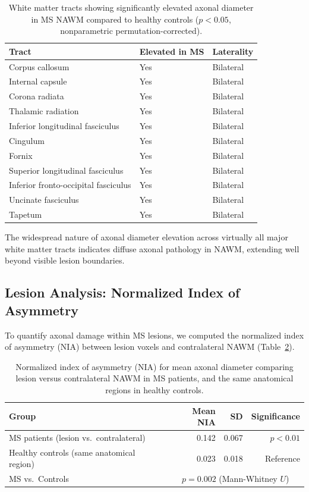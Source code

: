 \documentclass[11pt]{article}
\begin{document}
\begin{table}[H]
\centering
\caption{White matter tracts showing significantly elevated axonal diameter in MS NAWM compared to healthy controls ($p < 0.05$, nonparametric permutation-corrected).}
\label{tab:tbss}
\begin{tabular}{lll}
\toprule
\textbf{Tract} & \textbf{Elevated in MS} & \textbf{Laterality} \\
\midrule
Corpus callosum & Yes & Bilateral \\
Internal capsule & Yes & Bilateral \\
Corona radiata & Yes & Bilateral \\
Thalamic radiation & Yes & Bilateral \\
Inferior longitudinal fasciculus & Yes & Bilateral \\
Cingulum & Yes & Bilateral \\
Fornix & Yes & Bilateral \\
Superior longitudinal fasciculus & Yes & Bilateral \\
Inferior fronto-occipital fasciculus & Yes & Bilateral \\
Uncinate fasciculus & Yes & Bilateral \\
Tapetum & Yes & Bilateral \\
\bottomrule
\end{tabular}
\end{table}

The widespread nature of axonal diameter elevation across virtually all major white matter tracts indicates diffuse axonal pathology in NAWM, extending well beyond visible lesion boundaries.

\subsection{Lesion Analysis: Normalized Index of Asymmetry}

To quantify axonal damage within MS lesions, we computed the normalized index of asymmetry (NIA) between lesion voxels and contralateral NAWM (Table~\ref{tab:nia}).

\begin{table}[H]
\centering
\caption{Normalized index of asymmetry (NIA) for mean axonal diameter comparing lesion versus contralateral NAWM in MS patients, and the same anatomical regions in healthy controls.}
\label{tab:nia}
\begin{tabular}{lrrr}
\toprule
\textbf{Group} & \textbf{Mean NIA} & \textbf{SD} & \textbf{Significance} \\
\midrule
MS patients (lesion vs.\ contralateral) & 0.142 & 0.067 & $p < 0.01$ \\
Healthy controls (same anatomical region) & 0.023 & 0.018 & Reference \\
\midrule
MS vs.\ Controls & \multicolumn{3}{c}{$p = 0.002$ (Mann-Whitney $U$)} \\
\bottomrule
\end{tabular}
\end{table}
\end{document}
